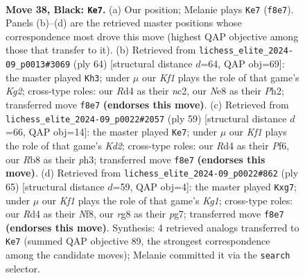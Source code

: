 \documentclass[11pt]{article}
\begin{document}
\clearpage

\begin{figure}[p]\centering
\begin{subfigure}{0.46\textwidth}\centering
\resizebox{\linewidth}{!}{%
\newchessgame
\chessboard[
  setfen={1r2nkR1/p1p5/2P2p2/8/3r1P1p/1P6/3B1K1P/5BR1 b - - 1 38},
  showmover=false,
  pgfstyle=straightmove, color=movearrow, markmove={f8-e7}
]}
\caption{}
\end{subfigure}\hfill
\begin{subfigure}{0.46\textwidth}\centering
\resizebox{\linewidth}{!}{%
\newchessgame
\chessboard[
  setfen={5rk1/1R4bp/1p4p1/p3P1N1/P7/1R4N1/1Pn2rKP/8 w - - 4 33},
  showmover=false,
  pgfstyle=straightmove, color=movearrow, markmove={g2-h3}
]}
\caption{}
\end{subfigure}
\\[4pt]
\begin{subfigure}{0.46\textwidth}\centering
\resizebox{\linewidth}{!}{%
\newchessgame
\chessboard[
  setfen={8/3k4/4ppp1/4R1p1/7n/7P/r3BPbP/3RK3 b - - 1 30},
  showmover=false,
  pgfstyle=straightmove, color=movearrow, markmove={d7-e7}
]}
\caption{}
\end{subfigure}\hfill
\begin{subfigure}{0.46\textwidth}\centering
\resizebox{\linewidth}{!}{%
\newchessgame
\chessboard[
  setfen={4rnk1/pp3pP1/6p1/3p2P1/8/2K5/2B2P2/6RR b - - 0 33},
  showmover=false,
  pgfstyle=straightmove, color=movearrow, markmove={g8-g7}
]}
\caption{}
\end{subfigure}
\caption{\textbf{Move 38, Black: \texttt{Ke7}.} (a) Our position; Melanie plays \texttt{Ke7} (\texttt{f8e7}). Panels (b)--(d) are the retrieved master positions whose correspondence most drove this move (highest QAP objective among those that transfer to it). (b) Retrieved from \texttt{lichess\_elite\_2024-09\_p0013\#3069} (ply 64) [structural distance $d$=64, QAP obj=69]: the master played \texttt{Kh3}; under $\mu$ our \emph{Kf1} plays the role of that game's \emph{Kg2}; cross-type roles: our \emph{R}d4 as their \emph{n}c2, our \emph{N}e8 as their \emph{P}h2; transferred move \texttt{f8e7} \textbf{(endorses this move)}. (c) Retrieved from \texttt{lichess\_elite\_2024-09\_p0022\#2057} (ply 59) [structural distance $d$=66, QAP obj=14]: the master played \texttt{Ke7}; under $\mu$ our \emph{Kf1} plays the role of that game's \emph{Kd2}; cross-type roles: our \emph{R}d4 as their \emph{P}f6, our \emph{R}b8 as their \emph{p}h3; transferred move \texttt{f8e7} \textbf{(endorses this move)}. (d) Retrieved from \texttt{lichess\_elite\_2024-09\_p0022\#862} (ply 65) [structural distance $d$=59, QAP obj=4]: the master played \texttt{Kxg7}; under $\mu$ our \emph{Kf1} plays the role of that game's \emph{Kg1}; cross-type roles: our \emph{R}d4 as their \emph{N}f8, our \emph{r}g8 as their \emph{p}g7; transferred move \texttt{f8e7} \textbf{(endorses this move)}. Synthesis: 4 retrieved analogs transferred to \texttt{Ke7} (summed QAP objective 89, the strongest correspondence among the candidate moves); Melanie committed it via the \texttt{search} selector.}
\label{fig:thought-m75}
\end{figure}
\end{document}
